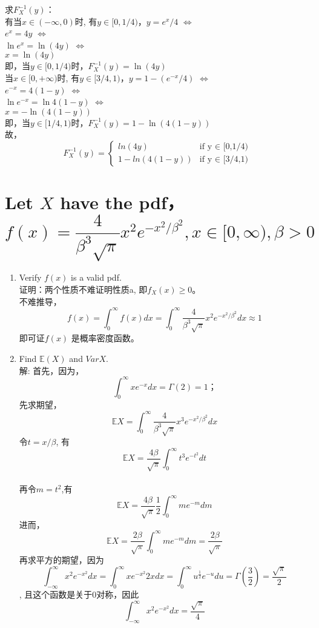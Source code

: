 \documentclass [12pt]{article}
\begin{document}
\begin{CJK*}{GBK}{kai}
\begin{enumerate}
求$F_{X}^{-1}(y)$：\\
有当$x \in (- \infty , 0)$时, 有$y \in [0,1/4)$，$y=e^x / 4$
 $\Leftrightarrow$\\
 $e^x=4y $
 $\Leftrightarrow$\\
 $\ln{e^x}=\ln{(4y)} $
$\Leftrightarrow$\\
 $x= \ln{(4y)} $\\
 即，当$y \in [0,1/4)$时，$F_{X}^{-1}(y)= \ln{(4y)}$\\
 当$x \in [0 , + \infty)$时, 有$y \in [3/4,1)$，$y= 1- (e^{-x} / 4) $
  $\Leftrightarrow$\\
 $e^{-x}=4(1-y) $
 $\Leftrightarrow$\\
 $\ln{e^{-x}}=\ln{4(1-y)} $
$\Leftrightarrow$\\
 $x=- \ln{(4(1-y))} $\\ 即，当$y \in [1/4,1)$时，$F_{X}^{-1}(y)=1 - \ln{(4(1-y))} $\\
故，$$F_{X}^{-1}(y)=
\begin{cases}
ln{(4y)} & \text{if y $\in$ [0,1/4)}\\
1 - ln{(4(1-y))} & \text{if y $\in$ [3/4,1)}
\end{cases}$$

\end{enumerate}
  
\section{Let $X$ have the pdf，  $$f(x)=\frac{4}{\beta^{3}\sqrt{\pi}}x^{2}e^{-x^2/\beta^{2}},x \in [0,\infty), \beta >0$$ }
   \begin{enumerate}
      \item[(a)] Verify $f(x)$ is a valid pdf.\\
      证明：两个性质不难证明性质a, 即$f_{X}(x) \ge 0$。\\
      不难推导，$$f(x)=\int_{0}^{\infty}f(x) dx = \int_{0}^{\infty}\frac{4}{\beta^{3}\sqrt{\pi}}x^{2}e^{-x^2/\beta^{2}} dx \approx 1$$ 即可证$f(x)$ 是概率密度函数。
      \item[(b)] Find  $\mathbb{E}(X)$ and $Var X$.\\
      解: 
      首先，因为，
$$ \int_{0}^\infty xe^{-x} dx=\Gamma{(2)} =1；
$$      先求期望，$$\mathbb{E}X=\int_{0}^{\infty}{\frac{4}{\beta^{3}\sqrt{\pi}}x^{3}e^{-x^2/\beta^{2}}}dx $$
      令$t=x/\beta$, 有$$\mathbb{E}X=\frac{4\beta}{\sqrt{\pi}}  \int_{0}^{\infty}{t^{3}e^{-t^{2}}}dt $$\\
      再令$m=t^2$,有$$\mathbb{E}X=\frac{4\beta}{\sqrt{\pi}} \frac{1}{2} \int_{0}^{\infty}{ m e^{-m}}dm $$
      进而，$$\mathbb{E}X=\frac{2\beta}{\sqrt{\pi}} \int_{0}^{\infty}{ m e^{-m}}dm = \frac{2\beta}{\sqrt{\pi}}$$
      	再求平方的期望，因为$$\int_{-\infty}^\infty x^2e^{-x^2} dx=\int_{0}^\infty xe^{-x^2} 2xdx=\int_{0}^\infty u^{\frac{1}{2}} e^{-u}du=\Gamma\left(\frac{3}{2}\right) =\frac{\sqrt{\pi}}{2}$$, 且这个函数是关于0对称，因此$$ \int_{-\infty}^\infty x^2e^{-x^2} dx=\frac{\sqrt{\pi}}{4}$$
	

\end{enumerate}
\end{CJK*}
\end{document}
